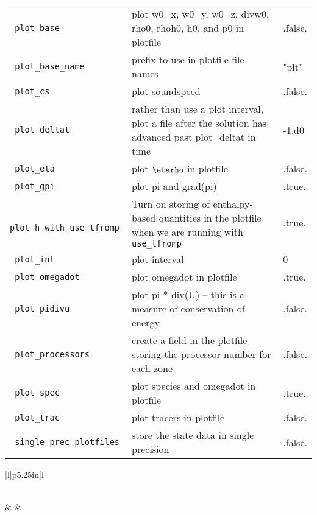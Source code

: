 \begin{landscape}
{\begin{center}
\begin{longtable}{|l|p{5.25in}|l|}
\rowcolor{tableShade}
\verb= plot_base = &  plot w0\_x, w0\_y, w0\_z, divw0, rho0, rhoh0, h0, and p0 in plotfile & .false. \\
\verb= plot_base_name = &  prefix to use in plotfile file names & "plt" \\
\rowcolor{tableShade}
\verb= plot_cs = &  plot soundspeed & .false. \\
\verb= plot_deltat = &  rather than use a plot interval, plot a file after the solution has advanced past plot\_deltat in time & -1.d0 \\
\rowcolor{tableShade}
\verb= plot_eta = &  plot $\etarho$ in plotfile & .false. \\
\verb= plot_gpi = &  plot pi and grad(pi) & .true. \\
\rowcolor{tableShade}
\verb= plot_h_with_use_tfromp = &  Turn on storing of enthalpy-based quantities in the plotfile when we are running with {\tt use\_tfromp} & .true. \\
\verb= plot_int = &  plot interval & 0 \\
\rowcolor{tableShade}
\verb= plot_omegadot = &  plot omegadot in plotfile & .true. \\
\verb= plot_pidivu = &  plot pi * div(U) -- this is a measure of conservation of energy & .false. \\
\rowcolor{tableShade}
\verb= plot_processors = &  create a field in the plotfile storing the processor number for each zone & .false. \\
\verb= plot_spec = &  plot species and omegadot in plotfile & .true. \\
\rowcolor{tableShade}
\verb= plot_trac = &  plot tracers in plotfile & .false. \\
\verb= single_prec_plotfiles = &  store the state data in single precision & .false. \\


\end{longtable}
\end{center}

} %


{\small

\renewcommand{\arraystretch}{1.5}
%
\begin{center}
\begin{longtable}{|l|p{5.25in}|l|}
\caption[ particles
 parameters.]{ particles
 parameters.} \label{table:  particles
 parameters. runtime} \\
%
\hline {} &
        &
        \\ \hline
\endfirsthead


\end{longtable}
\end{center}}
\end{landscape}
